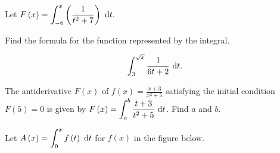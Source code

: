 \documentclass[12pt,addpoints, answers, fleqn]{exam}
\begin{document}
\begin{teacher}
\begin{questions}
\question 	%

Let $F\left( x \right) = \displaystyle \int_{-6}^x \left( \frac{1}{t^2+7} \right) \ {\rm{d}} t.$



\question 	%

Find the formula for the function represented by the integral.

\[
\int_{3}^{\sqrt{x}} \frac{1}{6t+2} \ {\rm{d}} t.
\]
\begin{solution}
\end{solution}

\question 	%

The antiderivative $F\left(x\right)$ of $f\left(x\right) = \displaystyle \frac{x + 3}{x^2 + 5}$ satisfying the initial condition $F\left(5\right) = 0$ is given by $F\left(x\right) = \displaystyle \int_a^b \frac{t+3}{t^2+5} \ {\rm{d}}t$. Find $a$ and $b$.
\begin{solution}
\end{solution}

 
\question 	%

Let $A\left( x \right) = \displaystyle \int_0^x f \left( t \right) \ {\rm{d}} t$ for $f\left( x \right)$ in the figure below.
\end{questions}
\end{teacher}
\end{document}
